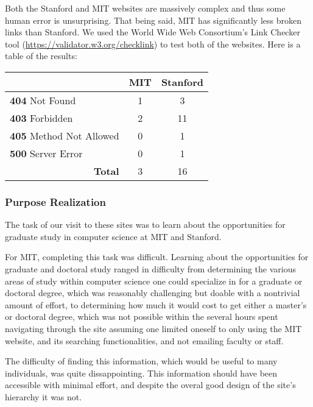 Both the Stanford and MIT websites are massively complex and thus some human error is unsurprising.
That being said, MIT has significantly less broken links than Stanford. We used the
World Wide Web Consortium's Link Checker tool (\url{https://validator.w3.org/checklink})
to test both of the websites. Here is a table of the results:

\begin{center}
\begin{tabular}{|l|c|c|}
\hline
                                     & \textbf{MIT} & \textbf{Stanford} \\ \hline
\textbf{404} Not Found               & 1            & 3                 \\ \hline
\textbf{403} Forbidden               & 2            & 11                \\ \hline
\textbf{405} Method Not Allowed      & 0            & 1                 \\ \hline
\textbf{500} Server Error            & 0            & 1                 \\ \hline \hline
\multicolumn{1}{|r|}{\textbf{Total}} & 3            & 16                \\ \hline
\end{tabular}
\end{center}

\pagebreak
\subsubsection*{Purpose Realization}

The task of our visit to these sites was to learn about the opportunities for
graduate study in computer science at MIT and Stanford.

For MIT, completing this task was difficult. Learning about the opportunities for
graduate and doctoral study ranged in difficulty from determining the various areas
of study within computer science one could specialize in for a graduate or doctoral
degree, which was reasonably challenging but doable with a nontrivial amount of effort,
to determining how much it would cost to get either a master's or doctoral degree,
which was not possible within the several hours spent navigating through the site
assuming one limited oneself to only using the MIT website, and its searching
functionalities, and not emailing faculty or staff.

The difficulty of finding this information, which would be useful to many individuals, was
quite dissappointing. This information should have been accessible with minimal effort, and
despite the overal good design of the site's hierarchy it was not.

